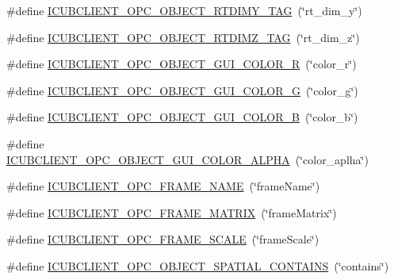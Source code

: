\begin{DoxyCompactItemize}
\item 
\#define \hyperlink{group__icubclient__tags_ga7c6e975306ff96ad3f1d3a0fadce827c}{I\+C\+U\+B\+C\+L\+I\+E\+N\+T\+\_\+\+O\+P\+C\+\_\+\+O\+B\+J\+E\+C\+T\+\_\+\+R\+T\+D\+I\+M\+Y\+\_\+\+T\+AG}~(\char`\"{}rt\+\_\+dim\+\_\+y\char`\"{})
\item 
\#define \hyperlink{group__icubclient__tags_ga0855e9683444b05cb093bf8277e86c1e}{I\+C\+U\+B\+C\+L\+I\+E\+N\+T\+\_\+\+O\+P\+C\+\_\+\+O\+B\+J\+E\+C\+T\+\_\+\+R\+T\+D\+I\+M\+Z\+\_\+\+T\+AG}~(\char`\"{}rt\+\_\+dim\+\_\+z\char`\"{})
\item 
\#define \hyperlink{group__icubclient__tags_ga60014114a1c544cbb6ac2f161916f4ea}{I\+C\+U\+B\+C\+L\+I\+E\+N\+T\+\_\+\+O\+P\+C\+\_\+\+O\+B\+J\+E\+C\+T\+\_\+\+G\+U\+I\+\_\+\+C\+O\+L\+O\+R\+\_\+R}~(\char`\"{}color\+\_\+r\char`\"{})
\item 
\#define \hyperlink{group__icubclient__tags_gaa1c715ca41ab55d65e542a338a30b4d8}{I\+C\+U\+B\+C\+L\+I\+E\+N\+T\+\_\+\+O\+P\+C\+\_\+\+O\+B\+J\+E\+C\+T\+\_\+\+G\+U\+I\+\_\+\+C\+O\+L\+O\+R\+\_\+G}~(\char`\"{}color\+\_\+g\char`\"{})
\item 
\#define \hyperlink{group__icubclient__tags_gafdee4e13d4653dde418d05bc9b1503e2}{I\+C\+U\+B\+C\+L\+I\+E\+N\+T\+\_\+\+O\+P\+C\+\_\+\+O\+B\+J\+E\+C\+T\+\_\+\+G\+U\+I\+\_\+\+C\+O\+L\+O\+R\+\_\+B}~(\char`\"{}color\+\_\+b\char`\"{})
\item 
\#define \hyperlink{group__icubclient__tags_ga58a6263fb0d2c7509f0a683bc280b823}{I\+C\+U\+B\+C\+L\+I\+E\+N\+T\+\_\+\+O\+P\+C\+\_\+\+O\+B\+J\+E\+C\+T\+\_\+\+G\+U\+I\+\_\+\+C\+O\+L\+O\+R\+\_\+\+A\+L\+P\+HA}~(\char`\"{}color\+\_\+aplha\char`\"{})
\item 
\#define \hyperlink{group__icubclient__tags_gad959e4112be1df3adcab627b97c48a40}{I\+C\+U\+B\+C\+L\+I\+E\+N\+T\+\_\+\+O\+P\+C\+\_\+\+F\+R\+A\+M\+E\+\_\+\+N\+A\+ME}~(\char`\"{}frame\+Name\char`\"{})
\item 
\#define \hyperlink{group__icubclient__tags_ga5ce5f535a1a2b4a0a7b8c9c840312ae5}{I\+C\+U\+B\+C\+L\+I\+E\+N\+T\+\_\+\+O\+P\+C\+\_\+\+F\+R\+A\+M\+E\+\_\+\+M\+A\+T\+R\+IX}~(\char`\"{}frame\+Matrix\char`\"{})
\item 
\#define \hyperlink{group__icubclient__tags_ga825208ce90300cf0467d88554e70f354}{I\+C\+U\+B\+C\+L\+I\+E\+N\+T\+\_\+\+O\+P\+C\+\_\+\+F\+R\+A\+M\+E\+\_\+\+S\+C\+A\+LE}~(\char`\"{}frame\+Scale\char`\"{})
\item 
\#define \hyperlink{group__icubclient__tags_ga87591d2352b2f40d44e5e53bf88417c0}{I\+C\+U\+B\+C\+L\+I\+E\+N\+T\+\_\+\+O\+P\+C\+\_\+\+O\+B\+J\+E\+C\+T\+\_\+\+S\+P\+A\+T\+I\+A\+L\+\_\+\+C\+O\+N\+T\+A\+I\+NS}~(\char`\"{}contains\char`\"{})

\end{DoxyCompactItemize}
